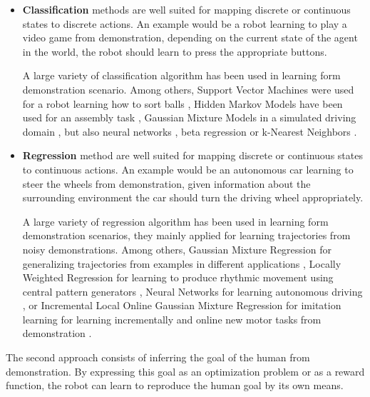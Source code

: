 \begin{itemize}

\item \textbf{Classification} methods are well suited for mapping discrete or continuous states to discrete actions. An example would be a robot learning to play a video game from demonstration, depending on the current state of the agent in the world, the robot should learn to press the appropriate buttons.

A large variety of classification algorithm has been used in learning form demonstration scenario. Among others, Support Vector Machines were used for a robot learning how to sort balls \cite{chernova2008teaching}, Hidden Markov Models have been used for an assembly task \cite{hovland1996skill}, Gaussian Mixture Models in a simulated driving domain \cite{chernova09jair}, but also neural networks \cite{mataric2000sensory}, beta regression \cite{montesano2009learning} or k-Nearest Neighbors \cite{saunders2006teaching}.

\item \textbf{Regression} method are well suited for mapping discrete or continuous states to continuous actions. An example would be an autonomous car learning to steer the wheels from demonstration, given information about the surrounding environment the car should turn the driving wheel appropriately.

A large variety of regression algorithm has been used in learning form demonstration scenarios, they mainly applied for learning trajectories from noisy demonstrations. Among others, Gaussian Mixture Regression for generalizing trajectories from examples in different applications \cite{calinon07}, Locally Weighted Regression for learning to produce rhythmic movement using central pattern generators \cite{schaal1998programmable,ijspeert2002learning}, Neural Networks for learning autonomous driving \cite{pomerleau1991efficient}, or Incremental Local Online Gaussian Mixture Regression for imitation learning for learning incrementally and online new motor tasks from demonstration \cite{cederborg2010incremental}.

\end{itemize}

The second approach consists of inferring the goal of the human from demonstration. By expressing this goal as an optimization problem or as a reward function, the robot can learn to reproduce the human goal by its own means.

